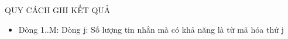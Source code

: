 QUY CÁCH GHI KẾT QUẢ  
\begin{itemize}
	\item     Dòng 1..M: Dòng j: Số lượng tin nhắn mà có khả năng là từ mã hóa thứ j   
\end{itemize}